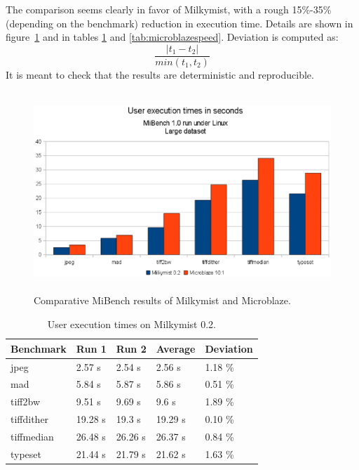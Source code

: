 \documentclass[a4paper,11pt]{kthesis}
\begin{document}
The comparison seems clearly in favor of Milkymist, with a rough 15\%-35\% (depending on the benchmark) reduction in execution time. Details are shown in figure~\ref{fig:mmvsmb} and in tables \ref{tab:milkymistspeed} and \ref{tab:microblazespeed}. Deviation is computed as:
\begin{equation}
\frac{|t_{1}-t_{2}|}{min(t_{1}, t_{2})}
\end{equation}
It is meant to check that the results are deterministic and reproducible.

\begin{figure}[htp]
\centering
\includegraphics[height=75mm]{mm_vs_mb.eps}
\caption{Comparative MiBench results of Milkymist and Microblaze.}
\label{fig:mmvsmb}
\end{figure}

\begin{table}
\centering
\begin{tabular}{|l|l|l|l|l|}
\hline
\textbf{Benchmark} & \textbf{Run 1} & \textbf{Run 2} & \textbf{Average} & \textbf{Deviation}  \\
\hline
jpeg & 2.57 s & 2.54 s & 2.56 s & 1.18 \% \\
\hline
mad & 5.84 s & 5.87 s & 5.86 s & 0.51 \% \\
\hline
tiff2bw & 9.51 s & 9.69 s & 9.6 s & 1.89 \% \\
\hline
tiffdither & 19.28 s & 19.3 s & 19.29 s & 0.10 \% \\
\hline
tiffmedian & 26.48 s & 26.26 s & 26.37 s & 0.84 \% \\
\hline
typeset & 21.44 s & 21.79 s & 21.62 s & 1.63 \% \\
\hline
\end{tabular}
\label{tab:milkymistspeed}
\caption{User execution times on Milkymist 0.2.}
\end{table}
\end{document}
